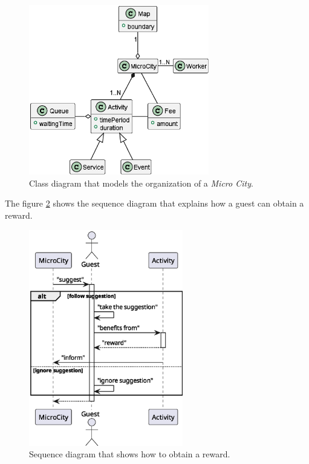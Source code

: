 \begin{figure}[H]
	\centering
	\includegraphics[width=0.7\textwidth]{img/micro_city-0.eps}
	\caption{Class diagram that models the organization of a \textit{Micro City}.}
	\label{fig:micro-city}
\end{figure}

\newpage

The figure \ref{fig:reward} shows the sequence diagram that explains how a guest can obtain a reward.

\begin{figure}[H]
	\centering
	\includegraphics[width=0.6\textwidth]{./img/reward-0}
	\caption{Sequence diagram that shows how to obtain a reward.}
	\label{fig:reward}
\end{figure}

\newpage